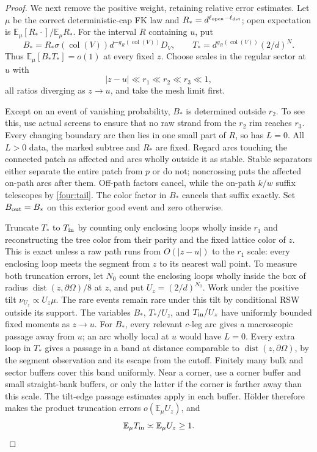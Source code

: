\begin{proof}
We next remove the positive weight, retaining relative error estimates.
Let $\mu$ be the correct deterministic-cap FK law and
$R_*=d^{\ell_{\rm open}-\ell_{\rm det}}$; open expectation is
$\mathbb E_\mu[R_*\cdot]/\mathbb E_\mu R_*$.  For the interval $R$
containing $u$, put
\begin{equation}
 B_*=R_*\sigma(\operatorname{col}(V))
             d^{-g_R(\operatorname{col}(V))}D_V,
 \qquad
 T_*=d^{g_R(\operatorname{col}(V))}(2/d)^N.
 \label{four:BT}
\end{equation}
Thus $\mathbb E_\mu[B_*T_*]=o(1)$ at every fixed $z$.
Choose scales in the regular sector at $u$ with
\begin{equation}
 |z-u|\ll r_1\ll r_2\ll r_3\ll1,
 \label{four:residual-scales}
\end{equation}
all ratios diverging as $z\to u$, and take the mesh limit first.

Except on an event of vanishing probability, $B_*$ is determined outside
$r_2$.  To see this, use actual screens to ensure that no raw strand
from the $r_2$ rim reaches $r_3$.  Every changing boundary arc then lies
in one small part of $R$, so has $L=0$.  All $L>0$ data, the marked
subtree and $R_*$ are fixed.  Regard arcs touching the connected patch
as affected and arcs wholly outside it as stable.  Stable separators
either separate the entire patch from $p$ or do not; noncrossing puts
the affected on-path arcs after them.  Off-path factors cancel, while
the on-path $k/w$ suffix telescopes by \eqref{four:tail}.  The color
factor in $B_*$ cancels that suffix exactly.  Set $B_{\rm out}=B_*$
on this exterior good event and zero otherwise.

Truncate $T_*$ to $T_{\rm in}$ by counting only enclosing loops wholly
inside $r_1$ and reconstructing the tree color from their parity and the
fixed lattice color of $z$.  This is exact unless a raw path runs from
$O(|z-u|)$ to the $r_1$ scale: every enclosing loop meets the segment
from $z$ to its nearest wall point.  To measure both truncation errors,
let $N_0$ count the enclosing loops wholly inside the box of radius
$\operatorname{dist}(z,\partial\Omega)/8$ at $z$, and put
$U_z=(2/d)^{N_0}$.  Work under the positive tilt
$\nu_{U_z}\propto U_z\mu$.  The rare events remain rare under this
tilt by conditional RSW outside its support.  The variables $B_*$,
$T_*/U_z$, and $T_{\rm in}/U_z$ have uniformly bounded fixed moments
as $z\to u$.  For $B_*$, every relevant $c$-leg arc gives a macroscopic
passage away from $u$; an arc wholly local at $u$ would have $L=0$.
Every extra loop in $T_*$ gives a passage in a band at distance comparable
to $\operatorname{dist}(z,\partial\Omega)$, by the segment observation
and its escape from the cutoff.  Finitely many bulk and sector buffers
cover this band uniformly.  Near a corner, use a corner buffer and small
straight-bank buffers, or only the latter if the corner is farther away
than this scale.  The tilt-edge passage estimates apply in each buffer.
H\"older therefore makes the product truncation errors
$o(\mathbb E_\mu U_z)$, and
\begin{equation}
 \mathbb E_\mu T_{\rm in}\asymp\mathbb E_\mu U_z\ge1.
 \label{four:T-comparison}
\end{equation}


\end{proof}
